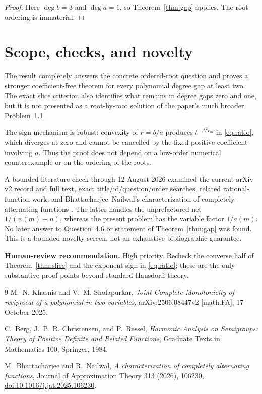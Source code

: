 \documentclass[11pt]{article}
\newcommand{\D}{\Delta}
\begin{document}
\begin{proof}
Here $\deg b=3$ and $\deg a=1$, so Theorem~\ref{thm:gap} applies.  The root
ordering is immaterial.
\end{proof}

\section{Scope, checks, and novelty}

The result completely answers the concrete ordered-root question and proves
a stronger coefficient-free theorem for every polynomial degree gap at least
two.  The exact slice criterion also identifies what remains in degree gaps
zero and one, but it is not presented as a root-by-root solution of the
paper's much broader Problem~1.1.

The sign mechanism is robust: convexity of $r=b/a$ produces
$t^{-\D^2r_m}$ in \eqref{eq:ratio}, which diverges at zero and cannot be
cancelled by the fixed positive coefficient involving $a$.  Thus the proof
does not depend on a low-order numerical counterexample or on the ordering of
the roots.

A bounded literature check through 12 August 2026 examined the current arXiv
v2 record and full text, exact title/id/question/order searches, related
rational-function work, and Bhattacharjee--Nailwal's characterization of
completely alternating functions \cite{BhattacharjeeNailwal}.  The latter
handles the unprefactored net $1/(\psi(m)+n)$, whereas the present problem has
the variable factor $1/a(m)$.  No later answer to Question~4.6 or statement of
Theorem~\ref{thm:gap} was found.  This is a bounded novelty screen, not an
exhaustive bibliographic guarantee.

\medskip
\noindent\textbf{Human-review recommendation.}
High priority.  Recheck the converse half of Theorem~\ref{thm:slice} and the
exponent sign in \eqref{eq:ratio}; these are the only substantive proof
points beyond standard Hausdorff theory.

\begin{thebibliography}{9}
M.~N. Khasnis and V.~M. Sholapurkar,
\emph{Joint Complete Monotonicity of reciprocal of a polynomial in two
variables}, arXiv:2506.08447v2 [math.FA], 17 October 2025.

C.~Berg, J.~P.~R. Christensen, and P.~Ressel,
\emph{Harmonic Analysis on Semigroups: Theory of Positive Definite and
Related Functions}, Graduate Texts in Mathematics 100, Springer, 1984.

M.~Bhattacharjee and R.~Nailwal,
\emph{A characterization of completely alternating functions}, Journal of
Approximation Theory 313 (2026), 106230,
\href{https://doi.org/10.1016/j.jat.2025.106230}{doi:10.1016/j.jat.2025.106230}.
\end{thebibliography}
\end{document}

